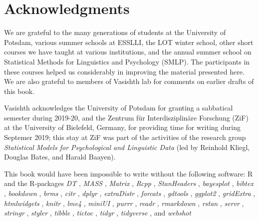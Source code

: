 \documentclass[12pt,]{krantz}
\theoremstyle{definition}
\theoremstyle{definition}
\theoremstyle{definition}
\theoremstyle{remark}
\begin{document}
\hypertarget{acknowledgments}{%
\section{Acknowledgments}\label{acknowledgments}}

We are grateful to the many generations of students at the University of Potsdam, various summer schools at ESSLLI, the LOT winter school, other short courses we have taught at various institutions, and the annual summer school on Statistical Methods for Linguistics and Psychology (SMLP). The participants in these courses helped us considerably in improving the material presented here. We are also grateful to members of Vasishth lab for comments on earlier drafts of this book.

Vasishth acknowledges the University of Potsdam for granting a sabbatical semester during 2019-20, and the Zentrum für Interdisziplinäre Forschung (ZiF) at the University of Bielefeld, Germany, for providing time for writing during Septemer 2019; this stay at ZiF was part of the activities of the research group \emph{Statistical Models for Psychological and Linguistic Data} (led by Reinhold Kliegl, Douglas Bates, and Harald Baayen).

This book would have been impossible to write without the following software: R \citep[Version 3.6.2;][]{R-base} and the R-packages \emph{DT} \citep[Version 0.11;][]{R-DT}, \emph{MASS} \citep[Version 7.3.51.5;][]{R-MASS}, \emph{Matrix} \citep[Version 1.2.18;][]{R-Matrix}, \emph{Rcpp} \citep[Version 1.0.3;][]{R-Rcpp}, \emph{StanHeaders} \citep[Version 2.19.0;][]{R-StanHeaders}, \emph{bayesplot} \citep[Version 1.7.1;][]{R-bayesplot}, \emph{bibtex} \citep[Version 0.4.2;][]{R-bibtex}, \emph{bookdown} \citep[Version 0.16;][]{R-bookdown}, \emph{brms} \citep[Version 2.10.0;][]{R-brms}, \emph{citr} \citep[Version 0.3.2;][]{R-citr}, \emph{dplyr} \citep[Version 0.8.3;][]{R-dplyr}, \emph{extraDistr} \citep[Version 1.8.11;][]{R-extraDistr}, \emph{forcats} \citep[Version 0.4.0;][]{R-forcats}, \emph{gdtools} \citep[Version 0.2.1;][]{R-gdtools}, \emph{ggplot2} \citep[Version 3.2.1;][]{R-ggplot2}, \emph{gridExtra} \citep[Version 2.3;][]{R-gridExtra}, \emph{htmlwidgets} \citep[Version 1.5.1;][]{R-htmlwidgets}, \emph{knitr} \citep[Version 1.26;][]{R-knitr}, \emph{lme4} \citep[Version 1.1.21;][]{R-lme4}, \emph{miniUI} \citep[Version 0.1.1.1;][]{R-miniUI}, \emph{purrr} \citep[Version 0.3.3;][]{R-purrr}, \emph{readr} \citep[Version 1.3.1;][]{R-readr}, \emph{rmarkdown} \citep[Version 2.0;][]{R-rmarkdown}, \emph{rstan} \citep[Version 2.19.2;][]{R-rstan}, \emph{servr} \citep[Version 0.15;][]{R-servr}, \emph{stringr} \citep[Version 1.4.0;][]{R-stringr}, \emph{styler} \citep[Version 1.2.0;][]{R-styler}, \emph{tibble} \citep[Version 2.1.3;][]{R-tibble}, \emph{tictoc} \citep[Version 1.0;][]{R-tictoc}, \emph{tidyr} \citep[Version 1.0.0;][]{R-tidyr}, \emph{tidyverse} \citep[Version 1.3.0;][]{R-tidyverse}, and \emph{webshot} \citep[Version 0.5.2;][]{R-webshot}
\end{document}
